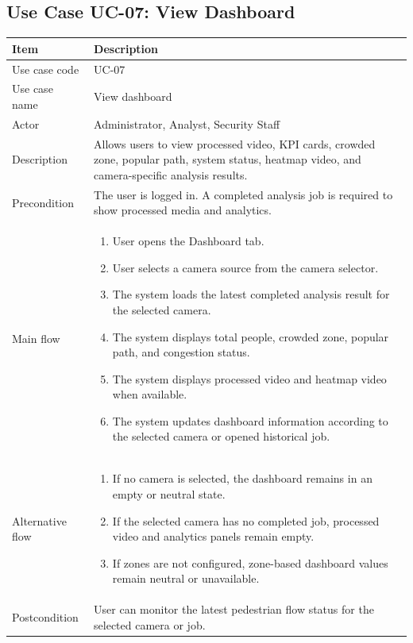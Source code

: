 \documentclass[12pt,a4paper]{report}
\begin{document}
\subsection{Use Case UC-07: View Dashboard}
\begin{longtable}{|p{3.6cm}|p{10.4cm}|}
\hline
\rowcolor{HeaderBlue}\textbf{Item} & \textbf{Description} \\
\hline
Use case code & UC-07 \\
\hline
Use case name & View dashboard \\
\hline
Actor & Administrator, Analyst, Security Staff \\
\hline
Description & Allows users to view processed video, KPI cards, crowded zone, popular path, system status, heatmap video, and camera-specific analysis results. \\
\hline
Precondition & The user is logged in. A completed analysis job is required to show processed media and analytics. \\
\hline
Main flow &
\begin{enumerate}
    \item User opens the Dashboard tab.
    \item User selects a camera source from the camera selector.
    \item The system loads the latest completed analysis result for the selected camera.
    \item The system displays total people, crowded zone, popular path, and congestion status.
    \item The system displays processed video and heatmap video when available.
    \item The system updates dashboard information according to the selected camera or opened historical job.
\end{enumerate} \\
\hline
Alternative flow &
\begin{enumerate}
    \item If no camera is selected, the dashboard remains in an empty or neutral state.
    \item If the selected camera has no completed job, processed video and analytics panels remain empty.
    \item If zones are not configured, zone-based dashboard values remain neutral or unavailable.
\end{enumerate} \\
\hline
Postcondition & User can monitor the latest pedestrian flow status for the selected camera or job. \\
\hline
\end{longtable}
\end{document}
